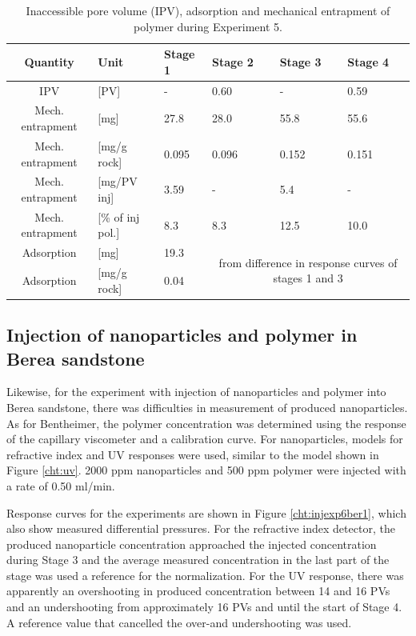 \begin{table}
\small
\centering
\caption{Inaccessible pore volume (IPV), adsorption and mechanical entrapment of polymer during Experiment 5.}
\label{tab:ipvexp5pol}
\begin{tabular}{c l l l l l } 
\toprule
\textbf{Quantity} & \textbf{Unit} & \textbf{Stage 1} & \textbf{Stage 2} & \textbf{Stage 3} & \textbf{Stage 4} \\ 
\midrule 
IPV                & [PV]           & -         & 0.60     & -         & 0.59     \\
Mech. entrapment   & [mg]          & 27.8       & 28.0      & 55.8       & 55.6       \\ 
Mech. entrapment   & [mg/g rock]   & 0.095   & 0.096     & 0.152     & 0.151     \\ 
Mech. entrapment   & [mg/PV inj]   & 3.59      & -         & 5.4      & -         \\
Mech. entrapment   & [\% of inj pol.]& 8.3       & 8.3      & 12.5       &10.0        \\ 
Adsorption         & [mg]          & 19.3      &   \multicolumn{3}{c}{\multirow{2}{15em}{from difference in response curves of stages 1 and 3}}        \\
Adsorption         & [mg/g rock]   & 0.04      &  \multicolumn{3}{c}{}    \\ 
\bottomrule
\end{tabular}
\end{table}

\subsection{Injection of nanoparticles and polymer in Berea sandstone}
Likewise, for the experiment with injection of nanoparticles and polymer into Berea sandstone, there was difficulties in measurement of produced nanoparticles. As for Bentheimer, the polymer concentration was determined using the response of the capillary viscometer and a calibration curve. For nanoparticles, models for refractive index and UV responses were used, similar to the model shown in Figure \ref{cht:uv}. 2000 ppm nanoparticles and 500 ppm polymer were injected with a rate of 0.50 ml/min. 

Response curves for the experiments are shown in Figure \ref{cht:injexp6ber1}, which also show measured differential pressures. For the refractive index detector, the produced nanoparticle concentration approached the injected concentration during Stage 3 and the average measured concentration in the last part of the stage was used a reference for the normalization. For the UV response, there was apparently an overshooting in produced concentration between 14 and 16 PVs and an undershooting from approximately 16 PVs and until the start of Stage 4. A reference value that cancelled the over-and undershooting was used. 

